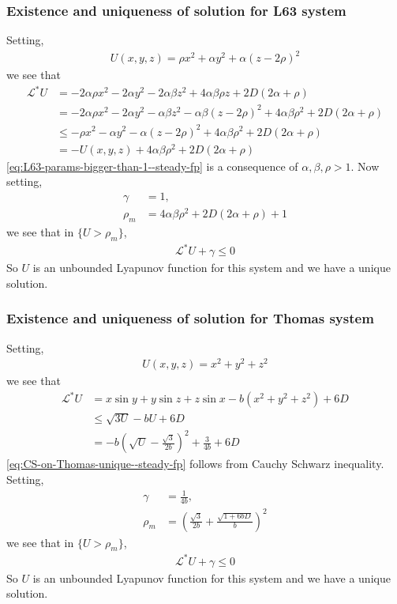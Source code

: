 \subsubsection{Existence and uniqueness of solution for L63 system}\label{sssec-L63-unique--steady-fp}
Setting,
\begin{align}
U(x, y, z) = \rho x^2 +\alpha y^2 + \alpha(z-2\rho)^2
\end{align}
we see that
\begin{align}
    \mathcal L^*U &= -2\alpha\rho x^2 - 2\alpha y^2 -2\alpha\beta z^2 + 4\alpha\beta\rho z + 2D(2\alpha+\rho)\\
    &=-2\alpha\rho x^2 - 2\alpha y^2 -\alpha\beta z^2 -\alpha\beta(z-2\rho)^2 + 4\alpha\beta\rho^2 + 2D(2\alpha+\rho)\\
    &\le -\rho x^2 -\alpha y^2 -\alpha(z-2\rho)^2 + 4\alpha\beta\rho^2 + 2D(2\alpha+\rho)\label{eq:L63-params-bigger-than-1--steady-fp}\\
    &= -U(x, y, z)+ 4\alpha\beta\rho^2 + 2D(2\alpha+\rho)
\end{align}
\eqref{eq:L63-params-bigger-than-1--steady-fp} is a consequence of $\alpha, \beta, \rho>1$. Now setting,
\begin{align}
    \gamma &= 1,\\
    \rho_m &= 4\alpha\beta\rho^2 + 2D(2\alpha+\rho)+1
\end{align} we see that in $\{U>\rho_m\}$,
\begin{align}
    \mathcal L^*U +\gamma \le 0
\end{align}
So $U$ is an unbounded Lyapunov function for this system and we have a unique solution.
\subsubsection{Existence and uniqueness of solution for Thomas system}\label{sssec-Thomas-unique--steady-fp}
Setting,
\begin{align}
    U(x, y, z) = x^2+y^2+z^2
\end{align}
we see that
\begin{align}
    \mathcal L^* U &= x\sin y + y\sin z + z\sin x - b(x^2+y^2+z^2) + 6D\\
    &\le \sqrt{3U}-bU + 6D\label{eq:CS-on-Thomas-unique--steady-fp}\\
    &= -b\left(\sqrt{U}-\frac{\sqrt{3}}{2b}\right)^2 +\frac{3}{4b}+6D
\end{align}
\eqref{eq:CS-on-Thomas-unique--steady-fp} follows from Cauchy Schwarz inequality. Setting,
\begin{align}
    \gamma &= \frac{1}{4b},\\
    \rho_m &= \left(\frac{\sqrt{3}}{2b}+\frac{\sqrt{1+6bD}}{b}\right)^2
\end{align}
we see that in $\{U>\rho_m\}$,
\begin{align}
    \mathcal L^*U +\gamma \le 0
\end{align}
So $U$ is an unbounded Lyapunov function for this system and we have a unique solution.

